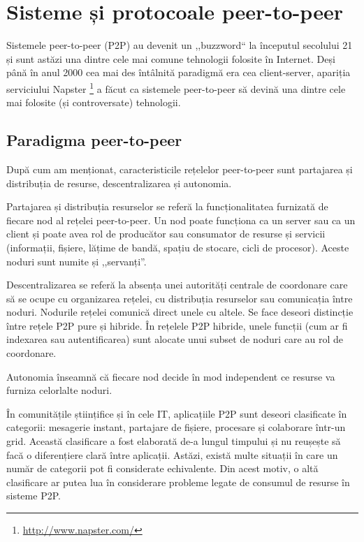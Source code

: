 
\chapter{Sisteme și protocoale peer-to-peer}
\label{chapter:p2p-systems}

Sistemele peer-to-peer (P2P) au devenit un ,,buzzword`` la începutul
secolului 21 și sunt astăzi una dintre cele mai comune tehnologii folosite
în Internet. Deși până în anul 2000 cea mai des întâlnită paradigmă
era cea client-server, apariția serviciului Napster
\footnote{\url{http://www.napster.com/}} a făcut ca sistemele peer-to-peer
să devină una dintre cele mai folosite (și controversate) tehnologii.

\section{Paradigma peer-to-peer}
\label{sec:p2p-systems:paragigm}

După cum am menționat, caracteristicile rețelelor peer-to-peer sunt 
partajarea și distribuția de resurse, descentralizarea și autonomia.

Partajarea și distribuția resurselor se referă la funcționalitatea
furnizată de fiecare nod al rețelei peer-to-peer. Un nod poate funcționa
ca un server sau ca un client și poate avea rol de producător sau
consumator de resurse și servicii (informații, fișiere, lățime de bandă,
spațiu de stocare, cicli de procesor). Aceste noduri sunt numite și ,,servanți''.

Descentralizarea se referă la absența unei autorități centrale de coordonare
care să se ocupe cu organizarea rețelei, cu distribuția resurselor sau
comunicația între noduri. Nodurile rețelei comunică direct unele cu altele.
Se face deseori distincție între rețele P2P pure și hibride. În rețelele P2P
hibride, unele funcții (cum ar fi indexarea sau autentificarea) sunt alocate
unui subset de noduri care au rol de coordonare.

Autonomia înseamnă că fiecare nod decide în mod independent ce resurse
va furniza celorlalte noduri.


În comunitățile științifice și în cele IT, aplicațiile P2P sunt deseori
clasificate în categorii: mesagerie instant, partajare de fișiere, procesare
și colaborare într-un grid.  Această clasificare a fost elaborată de-a lungul
timpului și nu reușește să facă o diferențiere clară între aplicații. Astăzi,
există multe situații în care un număr de categorii pot fi considerate
echivalente. Din acest motiv, o altă clasificare ar putea lua în considerare
probleme legate de consumul de resurse în sisteme P2P.

